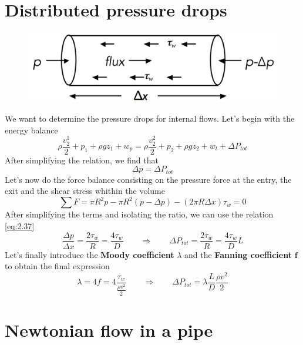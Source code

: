 \section{Distributed pressure drops}
	\begin{figure}
	\vspace{-5mm}
	\includegraphics[scale=0.2]{ch2/5}
	\end{figure}
	We want to determine the pressure drops for internal flows. Let's begin with the energy balance 
	\begin{equation}
			\rho \frac{v_2^1}{2} + p_1 + \rho gz_1 + w_p = \rho \frac{v_2^2}{2} + p_2 + \rho gz_2+w_t + \Delta P_{tot}
	\end{equation}
	After simplifying the relation, we find that 
	\begin{equation}
		\Delta p = \Delta P_{tot} 
		\label{eq:2.37}
	\end{equation}
	Let's now do the force balance consisting on the pressure force at the entry, the exit and the shear stress whithin the volume
	\begin{equation}
		\sum F = \pi R^2 p - \pi R^2 (p-\Delta p) - (2\pi R \Delta x)\tau _{w} = 0 
	\end{equation}
	After simplifying the terms and isolating the ratio, we can use the relation \autoref{eq:2.37}
	\begin{equation}
		\frac{\Delta p}{\Delta x} = \frac{2\tau _w}{R} = \frac{4 \tau _w}{D} \qquad \Rightarrow \qquad \Delta P_{tot} = \frac{2\tau _w}{R} = \frac{4 \tau _w}{D} L
	\end{equation}
	Let's finally introduce the \textbf{Moody coefficient} $\lambda$ and the \textbf{Fanning coefficient} $\mathbf{f}$ to obtain the final expression 
	\begin{equation}
		\lambda = 4f = 4\frac{\tau _w}{\frac{\rho v^2}{2}} \qquad \Rightarrow  \qquad \Delta P_{tot} = \lambda\frac{L}{D}\frac{\rho v^2}{2}
	\end{equation}

\section{Newtonian flow in a pipe}

